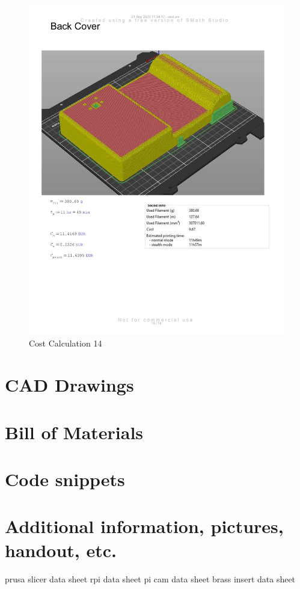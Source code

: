\begin{figure}[H]
    \centering
    \includegraphics[width=\linewidth]{texs/appendix/data/cost1-14.jpg}
    \caption{Cost Calculation 14}
    \label{fig:cost-calculation-14}
\end{figure}



\section{CAD Drawings}
\section{Bill of Materials}

\section{Code snippets}
\section{Additional information, pictures, handout, etc.}
prusa slicer data sheet
rpi data sheet
pi cam data sheet
brass insert data sheet
